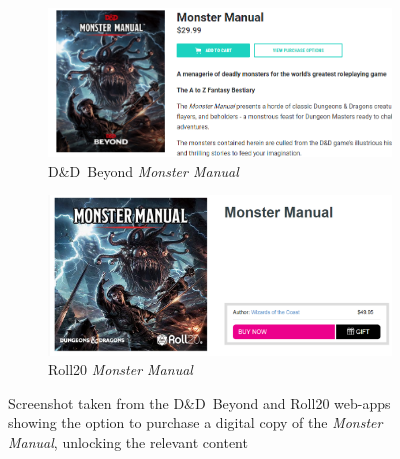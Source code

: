 \documentclass[final]{cmpreport}
\newcommand{\dnd}{D\&D}
\begin{document}
			\begin{figure}[h] 
				\begin{subfigure}{0.5\textwidth}
					\includegraphics[width=\linewidth]{dnd-beyond-mm-purchase.png}
					\caption{\dnd \ Beyond \emph{Monster Manual}} \label{fig:dnd-beyond-mm}
				\end{subfigure}
				\begin{subfigure}{0.5\textwidth}
					\includegraphics[width=\linewidth]{roll20-mm-purchase.png}
					\caption{Roll20 \emph{Monster Manual}} \label{fig:roll20-mm}
				\end{subfigure}
				\caption[\dnd \ Beyond and Roll20 Comparison Screenshots]{Screenshot taken from the \dnd \ Beyond and Roll20 web-apps showing the option to purchase a digital copy of the \emph{Monster Manual}, unlocking the relevant content} \label{fig:mm-purchases}
			\end{figure} 
			
\end{document}
